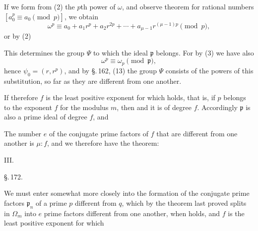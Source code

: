 If we form from (2) the $p$th power of $\omega$, and observe
 theorem for rational numbers $[a_0^p \equiv a_0 \pmod{p}]$,
we obtain
\[
\omega^p \equiv a_0 + a_1 r^p + a_2 r^{2p} + \cdots + a_{\mu-1} r^{(\mu-1)p} \pmod{p},
\]
or by (2)

This determines the group $\Psi$ to which the ideal $\mathfrak{p}$
belongs. For by (3) we have also
\[
\omega^p \equiv \omega_p \pmod{\mathfrak{p}},
\]
hence $\psi_0 = (r, r^p)$, and by \S.\,162, (13) the group $\Psi$ consists
of the powers of this substitution, so far as they are different
from one another.

If therefore $f$ is the least positive exponent for which
holds, that is, if $p$ belongs to the exponent $f$ for the modulus $m$, then
and it is of degree $f$. Accordingly $\mathfrak{p}$ is also a prime ideal
of degree $f$, and

The number $e$ of the conjugate prime factors of $f$ that are different
from one another is $\mu : f$, and we therefore have the theorem: %

III. 

\begin{center}
\S.\,172.

\end{center}

We must enter somewhat more closely into the formation of the conjugate prime factors $\mathfrak{p}_n$ of a prime $p$ different from $q$,
which by the theorem last proved splits in $\Omega_m$ into $e$
prime factors different from one another, when
holds, and $f$ is the least positive exponent for which
